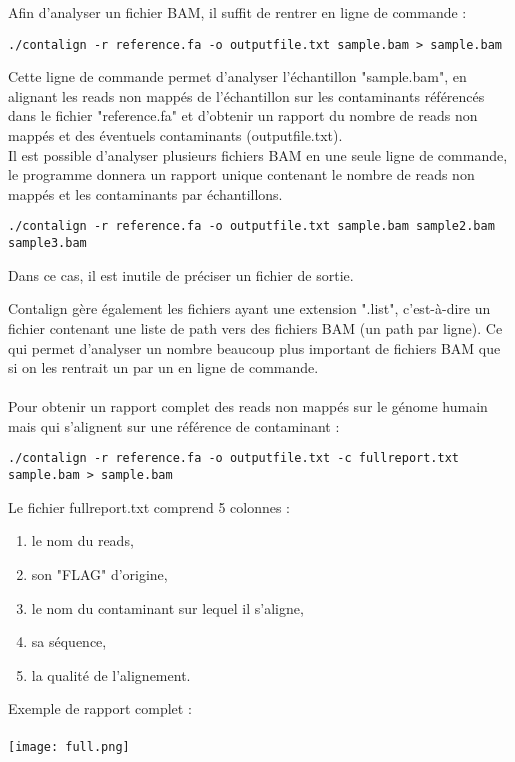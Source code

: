 \documentclass[a4paper,12pt]{article}
\begin{document}
Afin d'analyser un fichier BAM, il suffit de rentrer en ligne de commande :

\begin{lstlisting}
./contalign -r reference.fa -o outputfile.txt sample.bam > sample.bam
\end{lstlisting}

Cette ligne de commande permet d'analyser l'échantillon "sample.bam", en alignant les reads non mappés de l'échantillon sur les contaminants référencés dans le fichier "reference.fa" et d'obtenir un rapport du nombre de reads non mappés et des éventuels contaminants (outputfile.txt). \\
Il est possible d'analyser plusieurs fichiers BAM en une seule ligne de commande, le programme donnera un rapport unique contenant le nombre de reads non mappés et les contaminants par échantillons. 
\begin{lstlisting}
./contalign -r reference.fa -o outputfile.txt sample.bam sample2.bam sample3.bam
\end{lstlisting}
Dans ce cas, il est inutile de préciser un fichier de sortie. 
\clearpage

Contalign gère également les fichiers ayant une extension ".list", c'est-à-dire un fichier contenant une liste de path vers des fichiers BAM (un path par ligne). Ce qui permet d'analyser un nombre beaucoup plus important de fichiers BAM que si on les rentrait un par un en ligne de commande. \\
\\
Pour obtenir un rapport complet des reads non mappés sur le génome humain mais qui s'alignent sur une référence de contaminant : 
\begin{lstlisting}
./contalign -r reference.fa -o outputfile.txt -c fullreport.txt sample.bam > sample.bam\end{lstlisting}

Le fichier fullreport.txt comprend 5 colonnes :
\begin{enumerate}
\item le nom du reads,
\item son "FLAG" d'origine,
\item le nom du contaminant sur lequel il s'aligne, 
\item sa séquence,
\item la qualité de l'alignement.
\end{enumerate}

Exemple de rapport complet : \\\\
 \texttt{[image: full.png]}
 
\end{document}
